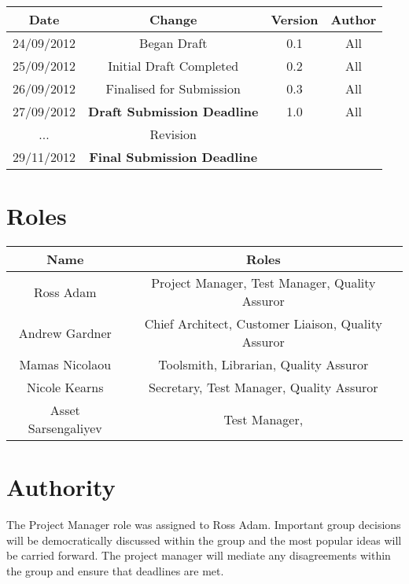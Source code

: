 \documentclass{l3deliverable}
\begin{document}
\begin{center}{
\begin{tabular}{|c|c|c|c|}
\hline \textbf{Date} &\textbf{Change} & \textbf{Version} & \textbf{Author}\\ 
\hline 24/09/2012 & Began Draft & 0.1 & All \\ 
\hline 25/09/2012 & Initial Draft Completed & 0.2 & All \\ 
\hline 26/09/2012 & Finalised for Submission & 0.3 & All\\ 
\hline 27/09/2012 & \textbf{Draft Submission Deadline} & 1.0 & All\\ 
\hline ... & Revision & & \\ 
\hline 29/11/2012 & \textbf{Final Submission Deadline} & & \\ 
\hline 
\end{tabular} }
\end{center}


\section{Roles}

\begin{center}{
\begin{tabular}{|c|c|}
\hline \textbf{Name} &\textbf{Roles}\\ 
\hline Ross Adam & Project Manager, Test Manager, Quality Assuror\\ 
\hline Andrew Gardner & Chief Architect, Customer Liaison, Quality Assuror  \\ 
\hline Mamas Nicolaou & Toolsmith, Librarian, Quality Assuror\\ 
\hline Nicole Kearns & Secretary, Test Manager, Quality Assuror\\ 
\hline Asset Sarsengaliyev & Test Manager,\\
\hline 
\end{tabular} }
\end{center}

\section{Authority}

The Project Manager role was assigned to Ross Adam. Important group decisions will be democratically discussed within the group and the most popular ideas will be carried forward. The project manager will mediate any disagreements within the group and ensure that deadlines are met.
\end{document}
